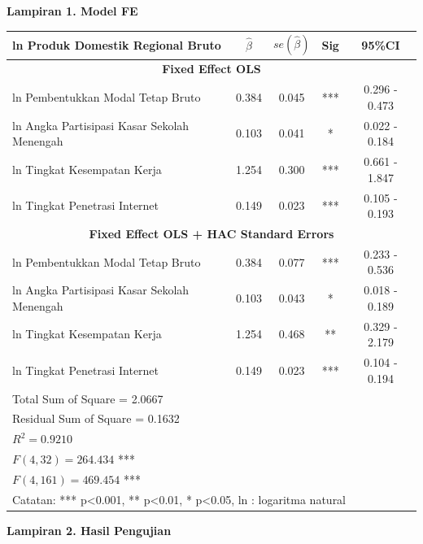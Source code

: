 \newpage
\singlespacing

\textbf{Lampiran 1. Model FE}

\begin{table}[h]
\centering
    \begin{tabular}[t]{p{7cm}cccc}
    \toprule
    ln Produk Domestik Regional Bruto & $\hat{\beta}$ & $se(\hat{\beta})$ & Sig & 95\%CI \\
    \midrule
        \multicolumn{5}{c}{\textbf{Fixed Effect OLS}}\\
    \midrule
    ln Pembentukkan Modal Tetap Bruto           & 0.384 & 0.045  & ***  & 0.296 - 0.473 \\
    ln Angka Partisipasi Kasar Sekolah Menengah & 0.103 & 0.041  & *    & 0.022 - 0.184 \\
    ln Tingkat Kesempatan Kerja                 & 1.254 & 0.300  & ***  & 0.661 - 1.847 \\
    ln Tingkat Penetrasi Internet               & 0.149 & 0.023  & ***  & 0.105 - 0.193 \\
    \midrule
        \multicolumn{5}{c}{\textbf{Fixed Effect OLS + HAC Standard Errors}}\\
    \midrule
    ln Pembentukkan Modal Tetap Bruto           & 0.384  & 0.077  & ***  & 0.233 - 0.536 \\
    ln Angka Partisipasi Kasar Sekolah Menengah & 0.103  & 0.043  & *    & 0.018 - 0.189 \\
    ln Tingkat Kesempatan Kerja                 & 1.254  & 0.468  & **   & 0.329 - 2.179 \\
    ln Tingkat Penetrasi Internet               & 0.149  & 0.023  & ***  & 0.104 - 0.194 \\
    \midrule
        \multicolumn{5}{l}{Total Sum of Square = 2.0667} \\
        \multicolumn{5}{l}{Residual Sum of Square = 0.1632} \\
        \multicolumn{5}{l}{$R^{2}= 0.9210$} \\
        \multicolumn{5}{l}{$F(4, 32) = 264.434$ ***} \\
        \multicolumn{5}{l}{$F(4, 161) = 469.454$ ***} \\
    \midrule
        \multicolumn{5}{l}{Catatan: *** p<0.001, ** p<0.01, * p<0.05, ln : logaritma natural}\\
    \bottomrule
    \end{tabular}
\end{table}

\textbf{Lampiran 2. Hasil Pengujian}

